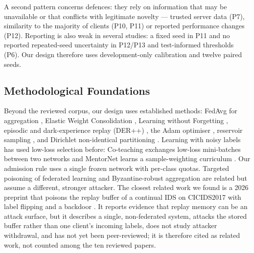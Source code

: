\documentclass[10pt,a4paper]{article}
\begin{document}
A second pattern concerns defences: they rely on information that may be unavailable or that conflicts with legitimate novelty --- trusted server data (P7), similarity to the majority of clients (P10, P11) or reported performance changes (P12). Reporting is also weak in several studies: a fixed seed in P11 and no reported repeated-seed uncertainty in P12/P13 and test-informed thresholds (P6). Our design therefore uses development-only calibration and twelve paired seeds.

\subsection{Methodological Foundations}
Beyond the reviewed corpus, our design uses established methods: FedAvg for aggregation \cite{fedavg}, Elastic Weight Consolidation \cite{ewc}, Learning without Forgetting \cite{lwf}, episodic and dark-experience replay (DER++) \cite{tiny,der}, the Adam optimiser \cite{adam}, reservoir sampling \cite{vitter}, and Dirichlet non-identical partitioning \cite{hsu}. Learning with noisy labels has used low-loss selection before: Co-teaching exchanges low-loss mini-batches between two networks and MentorNet learns a sample-weighting curriculum \cite{coteach,mentornet}. Our admission rule uses a single frozen network with per-class quotas. Targeted poisoning of federated learning \cite{tolpegin} and Byzantine-robust aggregation \cite{krum,yin} are related but assume a different, stronger attacker. The closest related work we found is a 2026 preprint that poisons the replay buffer of a continual IDS on CICIDS2017 with label flipping and a backdoor \cite{replaypoison}. It reports evidence that replay memory can be an attack surface, but it describes a single, non-federated system, attacks the stored buffer rather than one client's incoming labels, does not study attacker withdrawal, and has not yet been peer-reviewed; it is therefore cited as related work, not counted among the ten reviewed papers.
\end{document}
